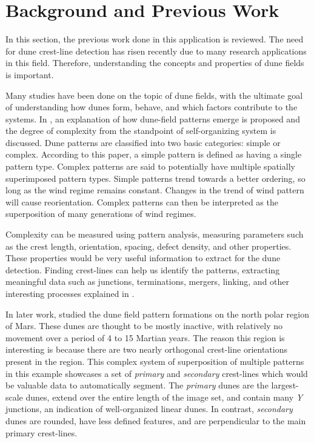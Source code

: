 \section{Background and Previous Work} \label{sec:background_perious_work}

In this section, the previous work done in this application is reviewed. The need for dune crest-line detection has risen recently due to many research applications in this field. Therefore, understanding the concepts and properties of dune fields is important. 

Many studies have been done on the topic of dune fields, with the ultimate goal of understanding how dunes form, behave, and which factors contribute to the systems. In \cite{Kocurek_Ewing}, an explanation of how dune-field patterns emerge is proposed and the degree of complexity from the standpoint of self-organizing system is discussed. Dune patterns are classified into two basic categories: simple or complex. According to this paper, a simple pattern is defined as having a single pattern type. Complex patterns are said to potentially have multiple spatially superimposed pattern types. Simple patterns trend towards a better ordering, so long as the wind regime remains constant. Changes in the trend of wind pattern will cause reorientation. Complex patterns can then be interpreted as the superposition of many generations of wind regimes.

Complexity can be measured using pattern analysis, measuring parameters such as the crest length, orientation, spacing,	defect density, and other properties. These properties would be very useful information to extract for the dune detection. Finding crest-lines	can help us identify the patterns, extracting meaningful data such as junctions, terminations, mergers, linking, and other interesting processes explained in \cite{Kocurek_Ewing}.

In later work, \cite{Ewing_Peyret_Kocurek_Bourke} studied the dune field pattern formations on the north polar region of Mars. These dunes are thought to be mostly inactive, with relatively no movement over a period of 4 to 15 Martian years. The reason this region is interesting is because there are two nearly orthogonal crest-line orientations present in the region. This complex system of superposition of multiple patterns in this example showcases a set of \emph{primary} and \emph{secondary} crest-lines which would be valuable data to automatically segment. The \emph{primary}	dunes are the largest-scale dunes, extend over the entire length of the image set, and contain many \emph{Y} junctions, an indication of well-organized linear dunes. In contrast, \emph{secondary} dunes are rounded, have less defined features, and are perpendicular to the main primary crest-lines.

